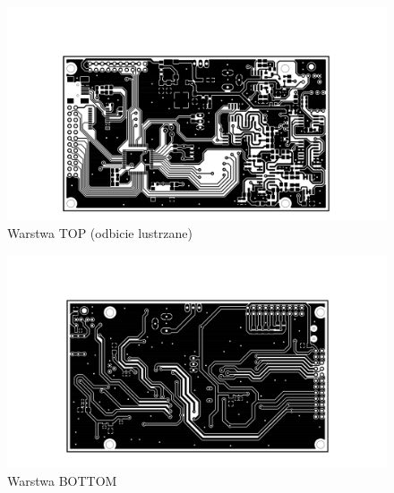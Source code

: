 \newpage
\begin{figure}[!ht]
	\centerline{\includegraphics[scale = 0.26]{graphic/top.png}}
	\caption{Warstwa TOP (odbicie lustrzane)}
	\label{rys:Dlon}
\end{figure}
\begin{figure}[!ht]
	\centerline{\includegraphics[scale = 0.26]{graphic/bottom.png}}
	\caption{Warstwa BOTTOM}
	\label{rys:Dlon}
\end{figure}
\newpage




